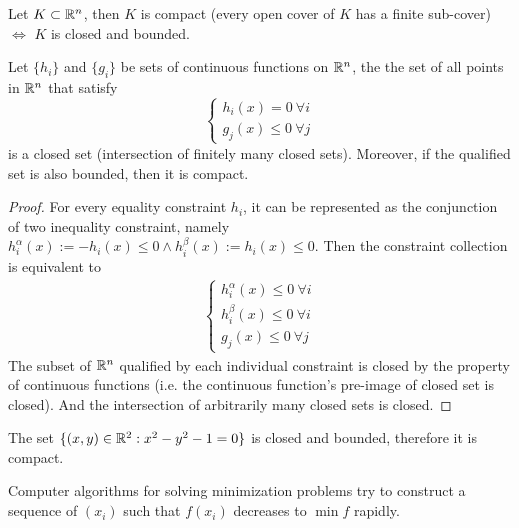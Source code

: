 \documentclass{article}
\begin{document}
    \begin{theorem}
    	Let $K \subset \mathbb{R}^n$, then $K$ is compact (every open cover of $K$ has a finite sub-cover) $\iff$ $K$ is closed and bounded.
    \end{theorem}
    
	\begin{proposition}
		Let $\{h_i\}$ and $\{g_i\}$ be sets of continuous functions on $\mathbb{R}^n$, the the set of all points in $\mathbb{R}^n$ that satisfy
		\begin{equation}
			\begin{cases}
				h_i(x) = 0\ \forall i\\
				g_j(x) \leq 0\ \forall j
			\end{cases}
		\end{equation}
		is a closed set (intersection of finitely many closed sets). Moreover, if the qualified set is also bounded, then it is compact.
	\end{proposition}
	
	\begin{proof}
		For every equality constraint $h_i$, it can be represented as the conjunction of two inequality constraint, namely $h_i^\alpha (x) := -h_i(x) \leq 0 \land h_i^\beta (x) := h_i(x) \leq 0$. Then the constraint collection is equivalent to
		\begin{align}
			\begin{cases}
				h_i^\alpha (x) \leq 0\ \forall i \\
				h_i^\beta (x) \leq 0\ \forall i \\
				g_j(x) \leq 0\ \forall j
			\end{cases}
		\end{align}
		The subset of $\mathbb{R}^n$ qualified by each individual constraint is closed by the property of continuous functions (i.e. the continuous function's pre-image of closed set is closed). And the intersection of arbitrarily many closed sets is closed.
	\end{proof}
	
	\begin{example}
		The set $\{(x, y) \in \mathbb{R}^2: x^2 - y^2 - 1 = 0\}$ is closed and bounded, therefore it is compact.
	\end{example}
    
    \begin{remark}
    	Computer algorithms for solving minimization problems try to construct a sequence of $(x_i)$ such that $f(x_i)$ decreases to $\min f$ rapidly.
    \end{remark}
    
\end{document}
